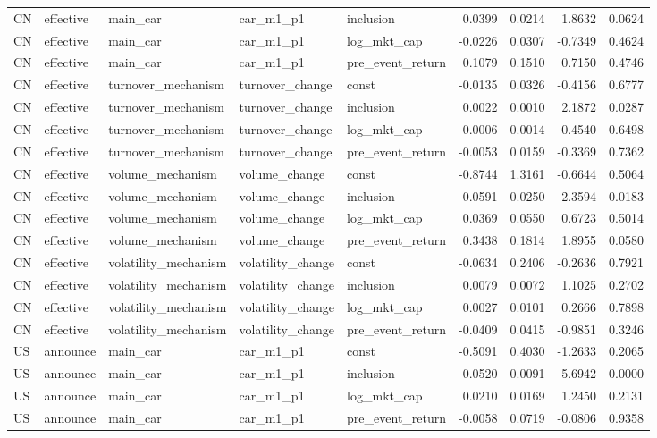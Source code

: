 \begin{tabular}{lllllrrrr}
CN & effective & main_car & car_m1_p1 & inclusion & 0.0399 & 0.0214 & 1.8632 & 0.0624 \\
CN & effective & main_car & car_m1_p1 & log_mkt_cap & -0.0226 & 0.0307 & -0.7349 & 0.4624 \\
CN & effective & main_car & car_m1_p1 & pre_event_return & 0.1079 & 0.1510 & 0.7150 & 0.4746 \\
CN & effective & turnover_mechanism & turnover_change & const & -0.0135 & 0.0326 & -0.4156 & 0.6777 \\
CN & effective & turnover_mechanism & turnover_change & inclusion & 0.0022 & 0.0010 & 2.1872 & 0.0287 \\
CN & effective & turnover_mechanism & turnover_change & log_mkt_cap & 0.0006 & 0.0014 & 0.4540 & 0.6498 \\
CN & effective & turnover_mechanism & turnover_change & pre_event_return & -0.0053 & 0.0159 & -0.3369 & 0.7362 \\
CN & effective & volume_mechanism & volume_change & const & -0.8744 & 1.3161 & -0.6644 & 0.5064 \\
CN & effective & volume_mechanism & volume_change & inclusion & 0.0591 & 0.0250 & 2.3594 & 0.0183 \\
CN & effective & volume_mechanism & volume_change & log_mkt_cap & 0.0369 & 0.0550 & 0.6723 & 0.5014 \\
CN & effective & volume_mechanism & volume_change & pre_event_return & 0.3438 & 0.1814 & 1.8955 & 0.0580 \\
CN & effective & volatility_mechanism & volatility_change & const & -0.0634 & 0.2406 & -0.2636 & 0.7921 \\
CN & effective & volatility_mechanism & volatility_change & inclusion & 0.0079 & 0.0072 & 1.1025 & 0.2702 \\
CN & effective & volatility_mechanism & volatility_change & log_mkt_cap & 0.0027 & 0.0101 & 0.2666 & 0.7898 \\
CN & effective & volatility_mechanism & volatility_change & pre_event_return & -0.0409 & 0.0415 & -0.9851 & 0.3246 \\
US & announce & main_car & car_m1_p1 & const & -0.5091 & 0.4030 & -1.2633 & 0.2065 \\
US & announce & main_car & car_m1_p1 & inclusion & 0.0520 & 0.0091 & 5.6942 & 0.0000 \\
US & announce & main_car & car_m1_p1 & log_mkt_cap & 0.0210 & 0.0169 & 1.2450 & 0.2131 \\
US & announce & main_car & car_m1_p1 & pre_event_return & -0.0058 & 0.0719 & -0.0806 & 0.9358 \\

\end{tabular}
